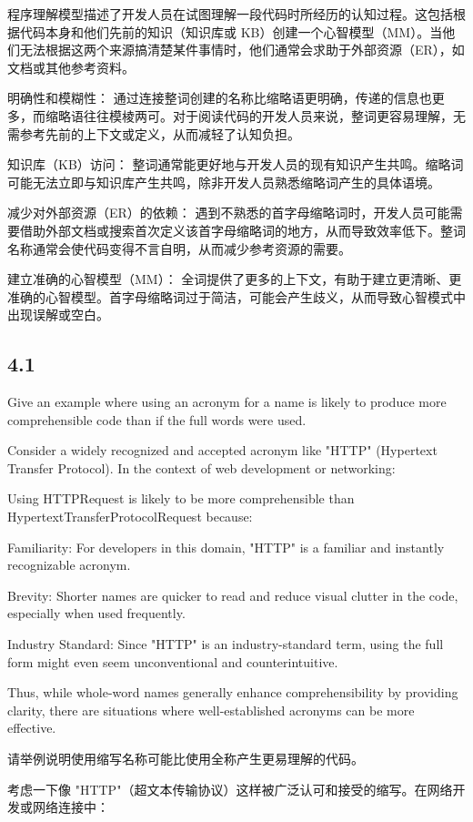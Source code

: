 程序理解模型描述了开发人员在试图理解一段代码时所经历的认知过程。这包括根据代码本身和他们先前的知识（知识库或 KB）创建一个心智模型（MM）。当他们无法根据这两个来源搞清楚某件事情时，他们通常会求助于外部资源（ER），如文档或其他参考资料。

明确性和模糊性： 通过连接整词创建的名称比缩略语更明确，传递的信息也更多，而缩略语往往模棱两可。对于阅读代码的开发人员来说，整词更容易理解，无需参考先前的上下文或定义，从而减轻了认知负担。

知识库（KB）访问： 整词通常能更好地与开发人员的现有知识产生共鸣。缩略词可能无法立即与知识库产生共鸣，除非开发人员熟悉缩略词产生的具体语境。

减少对外部资源（ER）的依赖： 遇到不熟悉的首字母缩略词时，开发人员可能需要借助外部文档或搜索首次定义该首字母缩略词的地方，从而导致效率低下。整词名称通常会使代码变得不言自明，从而减少参考资源的需要。

建立准确的心智模型（MM）： 全词提供了更多的上下文，有助于建立更清晰、更准确的心智模型。首字母缩略词过于简洁，可能会产生歧义，从而导致心智模式中出现误解或空白。

\subsection{4.1}
Give an example where using an acronym for a name is likely to produce more comprehensible code than if the full words were used.

Consider a widely recognized and accepted acronym like "HTTP" (Hypertext Transfer Protocol). In the context of web development or networking:

Using HTTPRequest is likely to be more comprehensible than HypertextTransferProtocolRequest because:

Familiarity: For developers in this domain, "HTTP" is a familiar and instantly recognizable acronym.

Brevity: Shorter names are quicker to read and reduce visual clutter in the code, especially when used frequently.

Industry Standard: Since "HTTP" is an industry-standard term, using the full form might even seem unconventional and counterintuitive.

Thus, while whole-word names generally enhance comprehensibility by providing clarity, there are situations where well-established acronyms can be more effective.

请举例说明使用缩写名称可能比使用全称产生更易理解的代码。

考虑一下像 "HTTP"（超文本传输协议）这样被广泛认可和接受的缩写。在网络开发或网络连接中：

